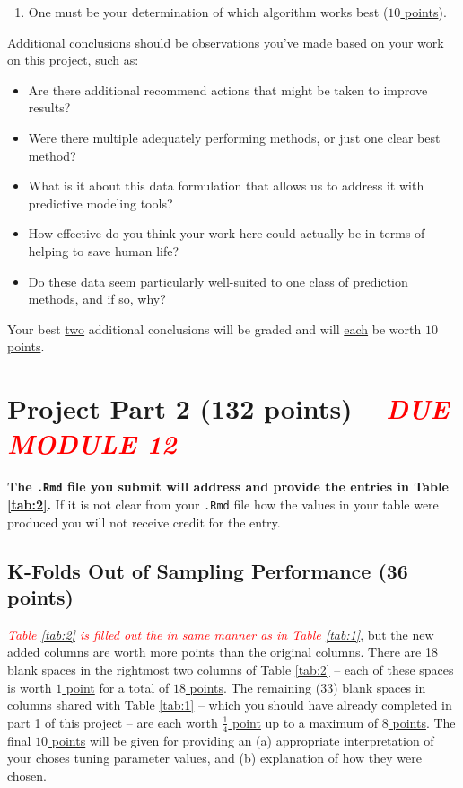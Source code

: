 \documentclass[11pt, oneside]{article}   	%
\begin{document}
\begin{enumerate}
\item One must be your determination of which algorithm works best (\underline{$10$ points}).
\end{enumerate}
Additional conclusions should be observations you've made based on your work on this project, such as:
\begin{itemize}
\item Are there additional recommend actions that might be taken to improve results?
\item Were there multiple adequately performing methods, or just one clear best method?
\item What is it about this data formulation that allows us to address it with predictive modeling tools? 
\item How effective do you think your work here could actually be in terms of helping to save human life? 
\item Do these data seem particularly well-suited to one class of prediction methods, and if so, why?
\end{itemize}

\noindent Your best \underline{two} additional conclusions will be graded and will \underline{each} be worth \underline{$10$ points}. 

\section{Project Part 2 (132 points) -- \textcolor{red}{\emph{DUE MODULE 12}}}
\textbf{The \texttt{.Rmd} file you submit will address and provide the entries in Table \ref{tab:2}.}
If it is not clear from your \texttt{.Rmd}  file how the values in your table were produced you will not receive credit for the entry. 

\subsection{K-Folds Out of Sampling Performance (36 points)}
\textcolor{red}{\emph{Table \ref{tab:2} is filled out the in same manner as in Table \ref{tab:1}}}, but the new added columns are worth more points than the original columns.
There are 18 blank spaces in the rightmost two columns of Table \ref{tab:2} -- each of these spaces is
worth \underline{$1$ point} for a total of \underline{$18$ points}.  The remaining (33) blank spaces in columns shared with 
Table \ref{tab:1} -- which you should have already completed in part 1 of this project -- are each worth 
\underline{$\frac{1}{4}$ point} up to a maximum of \underline{$8$ points}.   The final \underline{$10$ points} will be given for providing an (a) appropriate interpretation of your choses tuning parameter values, and (b) explanation of how they were chosen.  
\end{document}
